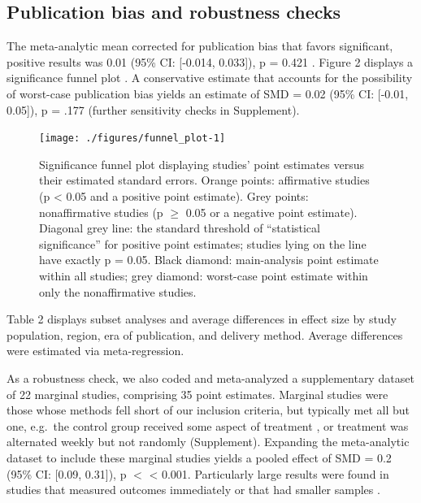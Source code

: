 \documentclass[sn-nature,referee,lineno,pdflatex]{sn-jnl}
\begin{document}
\subsection{Publication bias and robustness checks}\label{Sec2.3}

The meta-analytic mean corrected for publication bias that favors
significant, positive results was 0.01 (95\% CI: {[}-0.014, 0.033{]}), p
= 0.421 \citep{hedges1992}. Figure 2 displays a significance funnel plot
\citep{mathur2020}. A conservative estimate that accounts for the
possibility of worst-case publication bias yields an estimate of SMD =
0.02 (95\% CI: {[}-0.01, 0.05{]}), p = .177
\citep{mathur2020, mathur2024} (further sensitivity checks in
Supplement).

\begin{figure}[H]

{\centering \texttt{[image: ./figures/funnel\_plot-1]} 

}

\caption{Significance funnel plot displaying studies’ point estimates versus their estimated standard errors. Orange points: affirmative studies (p < 0.05 and a positive point estimate). Grey points: nonaffirmative studies (p $\geq$ 0.05 or a negative point estimate). Diagonal grey line: the standard threshold of “statistical significance” for positive point estimates; studies lying on the line have exactly p = 0.05. Black diamond: main-analysis point estimate within all studies; grey diamond: worst-case point estimate within only the nonaffirmative studies.}\label{fig:funnel_plot}
\end{figure}

Table 2 displays subset analyses and average differences in effect size
by study population, region, era of publication, and delivery method.
Average differences were estimated via meta-regression.

As a robustness check, we also coded and meta-analyzed a supplementary
dataset of 22 marginal studies, comprising 35 point estimates. Marginal
studies were those whose methods fell short of our inclusion criteria,
but typically met all but one, e.g.~the control group received some
aspect of treatment \citep{piazza2022}, or treatment was alternated
weekly but not randomly \citep{garnett2020} (Supplement). Expanding the
meta-analytic dataset to include these marginal studies yields a pooled
effect of SMD = 0.2 (95\% CI: {[}0.09, 0.31{]}), p \(<\) \textless{}
0.001. Particularly large results were found in studies that measured
outcomes immediately \citep{hansen2021} or that had smaller samples
\citep{lentz2020}.
\end{document}
